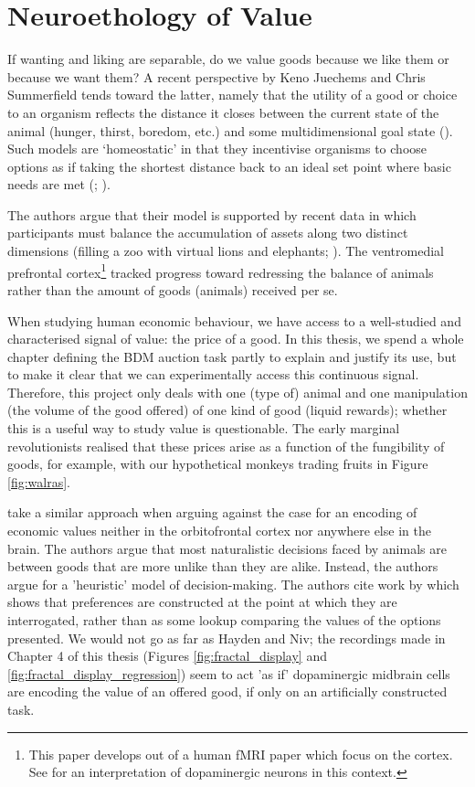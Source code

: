 \section{Neuroethology of Value}

If wanting and liking are separable, do we value goods because we like them or because we want them? A recent perspective by Keno Juechems and Chris Summerfield tends toward the latter, namely that the utility of a good or choice to an organism reflects the distance it closes between the current state of the animal (hunger, thirst, boredom, etc.) and some multidimensional goal state (\cite{juechemsWhereDoesValue2019}). Such models are ‘homeostatic’ in that they incentivise organisms to choose options as if taking the shortest distance back to an ideal set point where basic needs are met (\cite{keramatiHomeostaticReinforcementLearning2014}; \cite{oreillyGoalDrivenCognitionBrain2014}).

The authors argue that their model is supported by recent data in which participants must balance the accumulation of assets along two distinct dimensions (filling a zoo with virtual lions and elephants; \cite{juechemsNetworkComputingValue2019}). The ventromedial prefrontal cortex\footnote{This paper develops out of a human fMRI paper which focus on the cortex. See \cite{bogaczDopamineRoleLearning2020} for an interpretation of dopaminergic neurons in this context.} tracked progress toward redressing the balance of animals rather than the amount of goods (animals) received per se.

When studying human economic behaviour, we have access to a well-studied and characterised signal of value: the price of a good. In this thesis, we spend a whole chapter defining the BDM auction task partly to explain and justify its use, but to make it clear that we can experimentally access this continuous signal. Therefore, this project only deals with one (type of) animal and one manipulation (the volume of the good offered) of one kind of good (liquid rewards); whether this is a useful way to study value is questionable. The early marginal revolutionists realised that these prices arise as a function of the fungibility of goods, for example, with our hypothetical monkeys trading fruits in Figure \ref{fig:walras}.

\cite{haydenCaseEconomicValues2021} take a similar approach when arguing against the case for an encoding of economic values neither in the orbitofrontal cortex nor anywhere else in the brain. The authors argue that most naturalistic decisions faced by animals are between goods that are more unlike than they are alike. Instead, the authors argue for a 'heuristic' model of decision-making. The authors cite work by \cite{slovicConstructionPreference1995} which shows that preferences are constructed at the point at which they are interrogated, rather than as some lookup comparing the values of the options presented. We would not go as far as Hayden and Niv; the recordings made in Chapter 4 of this thesis (Figures \ref{fig:fractal_display} and \ref{fig:fractal_display_regression}) seem to act 'as if' dopaminergic midbrain cells are encoding the value of an offered good, if only on an artificially constructed task.

